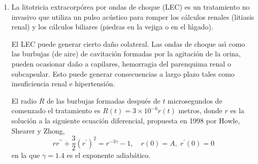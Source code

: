 \documentclass[letter,11pt]{article}
\begin{document}
\begin{enumerate}
$$
\left\lbrace
\begin{array}{l}
\dfrac{dc}{dt}=2c-\alpha c z, \qquad c(0)=c_0,\\
\\
\dfrac{dz}{dt}=-z+\alpha c za, \qquad z(0)=z_0,\\
\end{array}\right.
$$

donde $t$ es el tiempo medido en a\~nos, $c=c(t)$ es el n\'umero de conejos y $z=z(t)$ el n\'umero de zorros, ambos en el instante $t$, y $\alpha$ es una constante positiva que mide la probabilidad de interacci\'on entre miembros de las dos especies.

\begin{enumerate}
\item Cuando $\alpha= 0$, conejos y zorros no interact\'uan. Resuelva la ecuaci\'on diferencial a lo largo de un a\~no en el caso en que inicialmente hay 100 animales de cada especie. Compruebe que en
tal caso los conejos hacen lo que mejor saben hacer, mientras los zorros se van muriendo de
hambre.

\item Calcule la evoluci\'on de ambas poblaciones a lo largo de 12 a\~nos en el caso en que
la constante de interacci\'on es $\alpha = 0{.}01$ y que la poblaci\'on inicial es de 300 conejos y 150 zorros. >Qu\'e conclusi\'on puede extraer en este caso?

\item Repita la simulaci\'on anterior pero con poblaciones iniciales de 15 conejos y 22 zorros. >Cu\'al es ahora la conclusi\'on?
\end{enumerate}



\item La litotricia extracorp\'orea por ondas de choque (LEC)
es un tratamiento no invasivo que utiliza un pulso ac\'ustico para romper los c\'alculos renales
(litiasis renal) y los c\'alculos biliares (piedras en la vejiga o en el h\'{\i}gado).

El LEC puede generar cierto da\~no colateral.
Las ondas de choque as\'{\i} como las burbujas (de aire) de cavitaci\'on formadas por la
agitaci\'on de la orina, pueden ocasionar da\~no a capilares,
he\-mo\-rra\-gia del parenquima renal o subcapsular.
Esto puede generar consecuencias a largo plazo tales como insuficiencia renal e hipertensi\'on.

El radio $R$ de las burbujas formadas despu\'es de $t$ microsegundos de comenzado el tratamiento es $R(t) = 3\times 10^{-6} r(t)$ metros,
donde $r$ es la soluci\'on
a la siguiente ecuaci\'on diferencial, propuesta en 1998 por Howle, Shearer y Zhong,
\begin{equation}\label{bubblepvi}\tag{LEC}
rr^{\prime\prime} + \frac 3 2 \left(r^{\prime}\right)^2 = r^{-3\gamma} - 1,
\quad r(0) = A,\;r^{\prime}(0) = 0
\end{equation}
en la que $\gamma = 1.4$ es el exponente adiab\'atico.


\end{enumerate}
\end{document}
